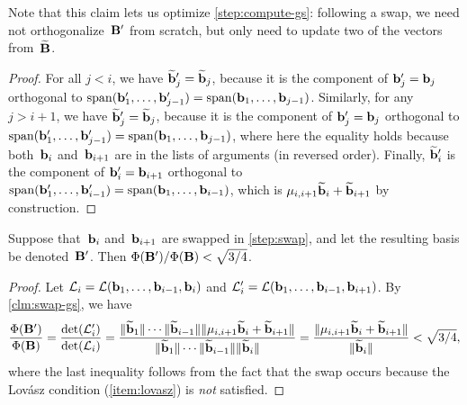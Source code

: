 \documentclass[11pt]{article}
\begin{document}
Note that this claim lets us optimize \cref{step:compute-gs}:
following a swap, we need not orthogonalize~$\mathbf{B}'$ from scratch, but
only need to update two of the vectors from~$\widetilde{\mathbf{B}}$.

\begin{proof}
  For all $j < i$, we have $\widetilde{\mathbf{b}}'_{j} = \widetilde{\mathbf{b}}_{j}$, because
  it is the component of $\mathbf{b}'_{j} = \mathbf{b}_{j}$ orthogonal to
  $\operatorname{span}(\mathbf{b}'_{1}, \ldots, \mathbf{b}'_{j-1}) = \operatorname{span}(\mathbf{b}_{1}, \ldots,
  \mathbf{b}_{j-1})$. Similarly, for any $j > i+1$, we have
  $\widetilde{\mathbf{b}}'_{j} = \widetilde{\mathbf{b}}_{j}$, because it is the component of
  $\mathbf{b}'_{j} = \mathbf{b}_{j}$ orthogonal to
  $\operatorname{span}(\mathbf{b}'_{1}, \ldots, \mathbf{b}'_{j-1}) = \operatorname{span}(\mathbf{b}_{1}, \ldots,
  \mathbf{b}_{j-1})$, where here the equality holds because
  both~$\mathbf{b}_{i}$ and~$\mathbf{b}_{i+1}$ are in the lists of arguments (in
  reversed order). Finally, $\widetilde{\mathbf{b}}'_{i}$ is the component of
  $\mathbf{b}'_{i} = \mathbf{b}_{i+1}$ orthogonal to
  $\operatorname{span}(\mathbf{b}'_{1}, \ldots, \mathbf{b}'_{i-1}) = \operatorname{span}(\mathbf{b}_{1}, \ldots,
  \mathbf{b}_{i-1})$, which is
  $\mu_{i,i+1} \widetilde{\mathbf{b}}_{i} + \widetilde{\mathbf{b}}_{i+1}$ by construction.
\end{proof}

\begin{lemma}
  \label{lem:lll-potential}
  Suppose that~$\mathbf{b}_{i}$ and~$\mathbf{b}_{i+1}$ are swapped in
  \cref{step:swap}, and let the resulting basis be denoted~$\mathbf{B}'$.
  Then $\Phi(\mathbf{B}')/\Phi(\mathbf{B}) < \sqrt{3/4}$.
\end{lemma}

\begin{proof}
  Let $\mathcal{L}_i = \mathcal{L}( \mathbf{b}_1, \ldots , \mathbf{b}_{i-1}, \mathbf{b}_i ) $ and
  $\mathcal{L}_i' = \mathcal{L}( \mathbf{b}_1, \ldots , \mathbf{b}_{i-1}, \mathbf{b}_{i+1} ) $. By
  \cref{clm:swap-gs}, we have
  \begin{equation}
    \begin{split}
      \frac{\Phi(\mathbf{B}')}{\Phi(\mathbf{B})} =
      \frac{\det(\mathcal{L}_i')}{\det(\mathcal{L}_i)} =
      \frac{\lVert\widetilde{\mathbf{b}}_{1}\rVert \cdots \lVert\widetilde{\mathbf{b}}_{i-1}\rVert
      \lVert\mu_{i,i+1} \widetilde{\mathbf{b}}_{i} + \widetilde{\mathbf{b}}_{i+1}\rVert
      }{\lVert\widetilde{\mathbf{b}}_{1}\rVert \cdots \lVert\widetilde{\mathbf{b}}_{i-1}\rVert
      \lVert\widetilde{\mathbf{b}}_{i}\rVert} = \frac{\lVert\mu_{i,i+1}
      \widetilde{\mathbf{b}}_{i} + \widetilde{\mathbf{b}}_{i+1}\rVert}{\lVert\widetilde{\mathbf{b}}_{i}\rVert}
      < \sqrt{3/4},
    \end{split}
  \end{equation}
  where the last inequality follows from the fact that the swap occurs
  because the Lov{\'a}sz condition (\cref{item:lovasz}) is \emph{not}
  satisfied.
\end{proof}
\end{document}
